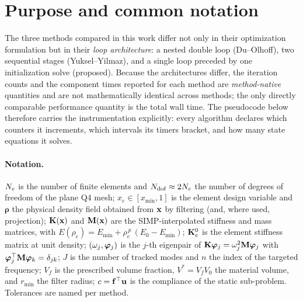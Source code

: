 \section{Purpose and common notation}

The three methods compared in this work differ not only in their
optimization formulation but in their \emph{loop architecture}: a nested
double loop (Du--Olhoff), two sequential stages (Yuksel--Yilmaz), and a
single loop preceded by one initialization solve (proposed).  Because the
architectures differ, the iteration counts and the component times reported
for each method are \emph{method-native} quantities and are not
mathematically identical across methods; the only directly comparable
performance quantity is the total wall time.  The pseudocode below therefore
carries the instrumentation explicitly: every algorithm declares which
counters it increments, which intervals its timers bracket, and how many
state equations it solves.

\paragraph{Notation.}
$N_e$ is the number of finite elements and $N_{\mathrm{dof}} \approx 2N_e$ the number of
degrees of freedom of the plane Q4 mesh;
$x_e \in [x_{\min},1]$ is the element design variable and
$\bm{\rho}$ the physical density field obtained from $\mathbf{x}$ by filtering
(and, where used, projection);
$\mathbf{K}(\mathbf{x})$ and $\mathbf{M}(\mathbf{x})$ are the SIMP-interpolated stiffness and
mass matrices, with
$E(\rho_e) = E_{\min} + \rho_e^{\,p}\,(E_0 - E_{\min})$;
$\mathbf{K}_e^0$ is the element stiffness matrix at unit density;
$(\omega_j,\bm{\varphi}_j)$ is the $j$-th eigenpair of
$\mathbf{K}\bm{\varphi}_j = \omega_j^2\mathbf{M}\bm{\varphi}_j$ with
$\bm{\varphi}_j^\top \mathbf{M} \bm{\varphi}_k = \delta_{jk}$;
$J$ is the number of tracked modes and $n$ the index of the targeted
frequency;
$V_f$ is the prescribed volume fraction, $V^\ast = V_f V_0$ the material
volume, and $r_{\min}$ the filter radius;
$c = \mathbf{f}^\top\mathbf{u}$ is the compliance of the static sub-problem.
Tolerances are named per method.

